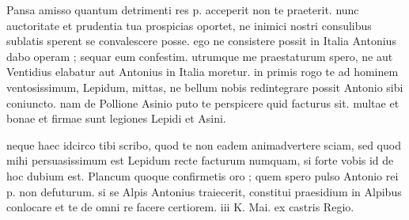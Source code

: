 


 Pansa amisso quantum detrimenti res p. acceperit non te praeterit. nunc auctoritate et prudentia tua prospicias oportet, ne inimici nostri consulibus sublatis sperent se convalescere posse. ego ne consistere possit in Italia Antonius dabo operam ; sequar eum confestim. utrumque me praestaturum spero, ne aut Ventidius elabatur aut Antonius in Italia moretur. in primis rogo te ad hominem ventosissimum, Lepidum, mittas, ne bellum nobis redintegrare possit Antonio sibi coniuncto. nam de Pollione Asinio puto te perspicere quid facturus sit. multae et bonae et firmae sunt legiones Lepidi et Asini.

 neque haec idcirco tibi scribo, quod te non eadem animadvertere sciam, sed quod mihi persuasissimum est Lepidum recte facturum numquam, si forte vobis id de hoc dubium est. Plancum quoque confirmetis oro ; quem spero pulso Antonio rei p. non defuturum. si se Alpis Antonius traiecerit, constitui praesidium in Alpibus conlocare et te de omni re facere certiorem. iii K. Mai. ex castris Regio.
